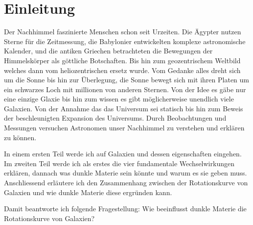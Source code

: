 
\section{Einleitung}

Der Nachhimmel faszinierte Menschen schon seit Urzeiten. Die Ägypter nutzen Sterne für die Zeitmessung, die Babylonier entwickelten komplexe astronomische
Kalender, und die antiken Griechen betrachteten die Bewegungen der Himmelskörper als göttliche Botschaften. Bis hin zum geozentrischem Weltbild welches dann vom 
heliozentrischen ersetz wurde. Vom Gedanke alles dreht sich um die Sonne bis hin zur Überlegung, die Sonne bewegt sich mit ihren Platen um ein schwarzes Loch mit millionen von anderen Sternen. Von der Idee es gäbe nur eine 
einzige Glaxie bis hin zum wissen es gibt möglicherweise unendlich viele Galaxien. Von der Annahme das das Universum sei statisch bis hin zum Beweis der beschleunigten Expansion des Universums. Durch 
Beobachtungen und Messungen versuchen Astronomen unser Nachhimmel zu verstehen und erklären zu können.


In einem ersten Teil werde ich  auf Galaxien und dessen eigenschaften eingehen. Im zweiten Teil werde ich als erstes die vier fundamentale Wechselwirkungen
erklären, dannach was dunkle Materie sein könnte und warum es sie geben muss. Anschliessend erläutere ich den Zusammenhang zwischen der Rotationskurve von 
Galaxien und wie dunkle Materie diese ergründen kann.

Damit beantworte ich folgende Fragestellung: Wie beeinflusst dunkle Materie die Rotationskurve von Galaxien?

